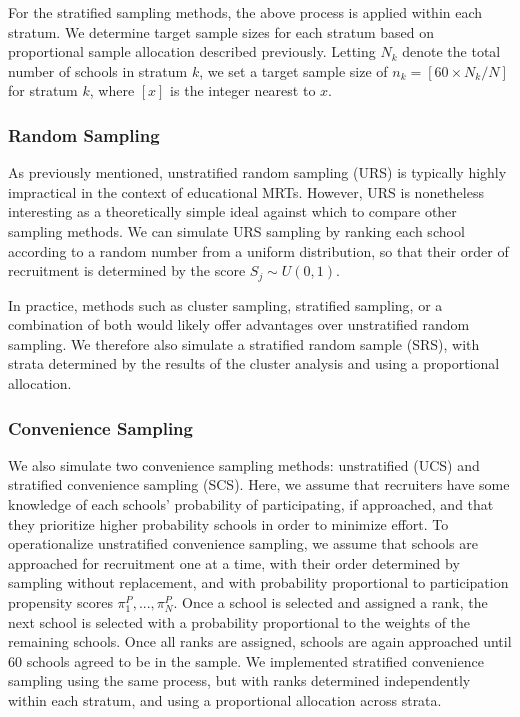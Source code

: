 \documentclass[english,man,floatsintext]{apa6}
\begin{document}
For the stratified sampling methods, the above process is applied within each stratum. We determine target sample sizes for each stratum based on proportional sample allocation described previously. Letting \(N_k\) denote the total number of schools in stratum \(k\), we set a target sample size of \(n_k = [60 \times N_k / N]\) for stratum \(k\), where \([x]\) is the integer nearest to \(x\).

\hypertarget{random-sampling}{%
\subsubsection{Random Sampling}\label{random-sampling}}

As previously mentioned, unstratified random sampling (URS) is typically highly impractical in the context of educational MRTs. However, URS is nonetheless interesting as a theoretically simple ideal against which to compare other sampling methods. We can simulate URS sampling by ranking each school according to a random number from a uniform distribution, so that their order of recruitment is determined by the score \(S_j \sim U(0, 1)\).

In practice, methods such as cluster sampling, stratified sampling, or a combination of both would likely offer advantages over unstratified random sampling. We therefore also simulate a stratified random sample (SRS), with strata determined by the results of the cluster analysis and using a proportional allocation.

\hypertarget{convenience-sampling}{%
\subsubsection{Convenience Sampling}\label{convenience-sampling}}

We also simulate two convenience sampling methods: unstratified (UCS) and stratified convenience sampling (SCS). Here, we assume that recruiters have some knowledge of each schools' probability of participating, if approached, and that they prioritize higher probability schools in order to minimize effort. To operationalize unstratified convenience sampling, we assume that schools are approached for recruitment one at a time, with their order determined by sampling without replacement, and with probability proportional to participation propensity scores \(\pi^P_1,...,\pi^P_N\).
Once a school is selected and assigned a rank, the next school is selected with a probability proportional to the weights of the remaining schools. Once all ranks are assigned, schools are again approached until 60 schools agreed to be in the sample. We implemented stratified convenience sampling using the same process, but with ranks determined independently within each stratum, and using a proportional allocation across strata.
\end{document}
